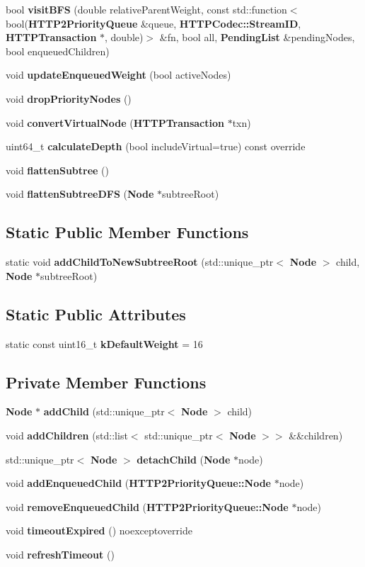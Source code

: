 \begin{DoxyCompactItemize}
\item 
bool {\bf visit\+B\+FS} (double relative\+Parent\+Weight, const std\+::function$<$ bool({\bf H\+T\+T\+P2\+Priority\+Queue} \&queue, {\bf H\+T\+T\+P\+Codec\+::\+Stream\+ID}, {\bf H\+T\+T\+P\+Transaction} $\ast$, double)$>$ \&fn, bool all, {\bf Pending\+List} \&pending\+Nodes, bool enqueued\+Children)
\item 
void {\bf update\+Enqueued\+Weight} (bool active\+Nodes)
\item 
void {\bf drop\+Priority\+Nodes} ()
\item 
void {\bf convert\+Virtual\+Node} ({\bf H\+T\+T\+P\+Transaction} $\ast$txn)
\item 
uint64\+\_\+t {\bf calculate\+Depth} (bool include\+Virtual=true) const override
\item 
void {\bf flatten\+Subtree} ()
\item 
void {\bf flatten\+Subtree\+D\+FS} ({\bf Node} $\ast$subtree\+Root)
\end{DoxyCompactItemize}
\subsection*{Static Public Member Functions}
\begin{DoxyCompactItemize}
\item 
static void {\bf add\+Child\+To\+New\+Subtree\+Root} (std\+::unique\+\_\+ptr$<$ {\bf Node} $>$ child, {\bf Node} $\ast$subtree\+Root)
\end{DoxyCompactItemize}
\subsection*{Static Public Attributes}
\begin{DoxyCompactItemize}
\item 
static const uint16\+\_\+t {\bf k\+Default\+Weight} = 16
\end{DoxyCompactItemize}
\subsection*{Private Member Functions}
\begin{DoxyCompactItemize}
\item 
{\bf Node} $\ast$ {\bf add\+Child} (std\+::unique\+\_\+ptr$<$ {\bf Node} $>$ child)
\item 
void {\bf add\+Children} (std\+::list$<$ std\+::unique\+\_\+ptr$<$ {\bf Node} $>$$>$ \&\&children)
\item 
std\+::unique\+\_\+ptr$<$ {\bf Node} $>$ {\bf detach\+Child} ({\bf Node} $\ast$node)
\item 
void {\bf add\+Enqueued\+Child} ({\bf H\+T\+T\+P2\+Priority\+Queue\+::\+Node} $\ast$node)
\item 
void {\bf remove\+Enqueued\+Child} ({\bf H\+T\+T\+P2\+Priority\+Queue\+::\+Node} $\ast$node)
\item 
void {\bf timeout\+Expired} () noexceptoverride
\item 
void {\bf refresh\+Timeout} ()
\end{DoxyCompactItemize}
